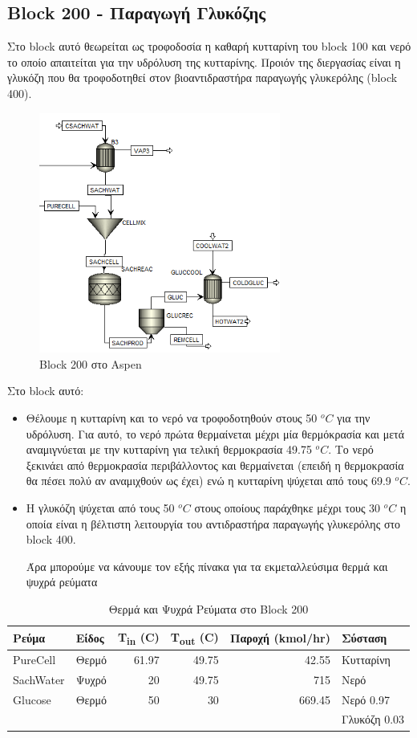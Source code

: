 \documentclass[11pt]{article}
\begin{document}
\subsection{Block 200 - Παραγωγή Γλυκόζης}
\label{sec:org9e1c722}
Στο block αυτό θεωρείται ως τροφοδοσία η καθαρή κυτταρίνη του block 100 και νερό το οποίο απαιτείται για την υδρόλυση της κυτταρίνης. Προιόν της διεργασίας είναι η γλυκόζη που θα τροφοδοτηθεί στον βιοαντιδραστήρα παραγωγής γλυκερόλης (block 400).

\begin{figure}[htbp]
\centering
\includegraphics[width=300px]{Block_200_-_Παραγωγή_Γλυκόζης/2023-03-11_16-51-41_screenshot.png}
\caption{Block 200 στο Aspen}
\end{figure}


Στο block αυτό:
\begin{itemize}
\item Θέλουμε η κυτταρίνη και το νερό να τροφοδοτηθούν στους 50 \(^oC\) για την υδρόλυση. Για αυτό, το νερό πρώτα θερμαίνεται μέχρι μία θερμόκρασία και μετά αναμιγνύεται με την κυτταρίνη για τελική θερμοκρασία 49.75 \(^oC\). Το νερό ξεκινάει από θερμοκρασία περιβάλλοντος και θερμαίνεται (επειδή η θερμοκρασία θα πέσει πολύ αν αναμιχθούν ως έχει) ενώ η κυτταρίνη ψύχεται από τους 69.9 \(^oC\).
\item Η γλυκόζη ψύχεται από τους 50 \(^oC\) στους οποίους παράχθηκε μέχρι τους 30 \(^oC\) η οποία είναι η βέλτιστη λειτουργία του αντιδραστήρα παραγωγής γλυκερόλης στο block 400.

Άρα μπορούμε να κάνουμε τον εξής πίνακα για τα εκμεταλλεύσιμα θερμά και ψυχρά ρεύματα
\end{itemize}
\begin{table}[htbp]
\caption{Θερμά και Ψυχρά Ρεύματα στο Block 200}
\centering
\begin{tabular}{llrrrl}
Ρεύμα & Είδος & Τ\textsubscript{in} (C) & Τ\textsubscript{out} (C) & Παροχή (kmol/hr) & Σύσταση\\
\hline
PureCell & Θερμό & 61.97 & 49.75 & 42.55 & Κυτταρίνη\\
\hline
SachWater & Ψυχρό & 20 & 49.75 & 715 & Νερό\\
\hline
Glucose & Θερμό & 50 & 30 & 669.45 & Νερό 0.97\\
 &  &  &  &  & Γλυκόζη 0.03\\
\hline
\end{tabular}
\end{table}
\end{document}
